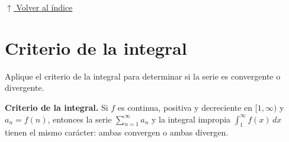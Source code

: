\documentclass[12pt]{article}
\newcommand{\volverindice}{%
    \vspace{1em}%
    \begin{flushright}%
        \hyperlink{indice}{\small $\uparrow$ Volver al índice}%
    \end{flushright}%
}
\begin{document}
\volverindice
\newpage


\section{Criterio de la integral}

Aplique el criterio de la integral para determinar si la serie es convergente o
divergente.

\vspace{0.5em}
\textbf{Criterio de la integral.} Si $f$ es continua, positiva y decreciente en
$[1,\infty)$ y $a_n=f(n)$, entonces la serie
$\displaystyle\sum_{n=1}^{\infty}a_n$ y la integral impropia
$\displaystyle\int_{1}^{\infty}f(x)\,dx$ tienen el mismo carácter: ambas
convergen o ambas divergen.
\end{document}
